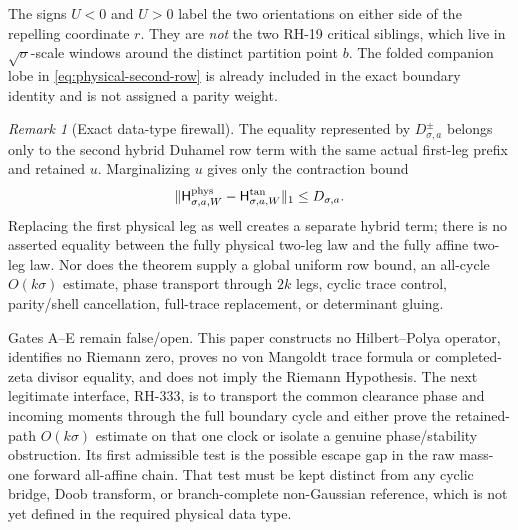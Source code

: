 \documentclass[11pt]{article}
\theoremstyle{definition}
\theoremstyle{remark}
\newtheorem{remark}[theorem]{Remark}
\newcommand{\1}{\mathbf 1}
\begin{document}
The signs $U<0$ and $U>0$ label the two orientations on either side of the
repelling coordinate $r$.  They are \emph{not} the two RH-19 critical
siblings, which live in $\sqrt\sigma$-scale windows around the distinct
partition point $b$.  The folded companion lobe in
\eqref{eq:physical-second-row} is already included in the exact boundary
identity and is not assigned a parity weight.

\begin{remark}[Exact data-type firewall]\label{rem:firewall}
The equality represented by $D_{\sigma,a}^{\pm}$ belongs only to the second
hybrid Duhamel row term with the same actual first-leg prefix and retained
$u$.  Marginalizing $u$ gives only the contraction bound
\[
 \|\mathsf H^{\rm phys}_{\sigma,a,W}
   -\mathsf H^{\rm tan}_{\sigma,a,W}\|_1
 \le D_{\sigma,a}.
\]
Replacing the first physical leg as well creates a separate hybrid term;
there is no asserted equality between the fully physical two-leg law and
the fully affine two-leg law.  Nor does the theorem supply a global
uniform row bound, an all-cycle $O(k\sigma)$ estimate, phase transport
through $2k$ legs, cyclic trace control, parity/shell cancellation,
full-trace replacement, or determinant gluing.
\end{remark}

Gates A--E remain false/open.  This paper constructs no Hilbert--Polya
operator, identifies no Riemann zero, proves no von Mangoldt trace formula
or completed-zeta divisor equality, and does not imply the Riemann
Hypothesis.  The next legitimate interface, RH-333, is to transport the
common clearance phase and incoming moments through the full boundary cycle
and either prove the retained-path $O(k\sigma)$ estimate on that one clock
or isolate a genuine phase/stability obstruction.  Its first admissible
test is the possible escape gap in the raw mass-one forward all-affine
chain.  That test must be kept distinct from any cyclic bridge, Doob
transform, or branch-complete non-Gaussian reference, which is not yet
defined in the required physical data type.
\end{document}
